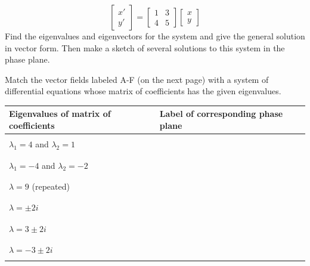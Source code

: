 \[ \left[ \begin{array}{c}
x'\\
y'
\end{array} \right] = 
\left[ \begin{array}{cc}
1 & 3 \\
4 & 5 
\end{array} \right]
\left[ \begin{array}{c}
x\\
y
\end{array} \right] \]
Find the eigenvalues and eigenvectors for the system and give the general solution in vector form. Then make a sketch of several solutions to this system in the phase plane. \label{14problem5} 


\clearpage


\ii Match the vector fields labeled A-F (on the next page) with a system of differential equations whose matrix of coefficients has the given eigenvalues.\label{14problem6} 

\bs

\begin{center}\begin{tabular}{|l|l|}
\hline
Eigenvalues of matrix of coefficients & Label of corresponding phase plane\\
\hline
 & \\
$\lambda_1  = 4$ and $\lambda_2=1$ & \\ %
& \\
\hline
& \\
$\lambda_1 = -4$ and $\lambda_2 = -2$ & \\ %
& \\
\hline
& \\
$\lambda = 9$ (repeated) & \\ %
& \\
\hline
& \\
$\lambda = \pm 2i$ & \\ %
& \\
\hline
& \\
$\lambda = 3 \pm 2i$  & \\ %
& \\
\hline
& \\
$\lambda = -3 \pm 2i$  & \\ %
& \\
\hline
\end{tabular}\end{center}

